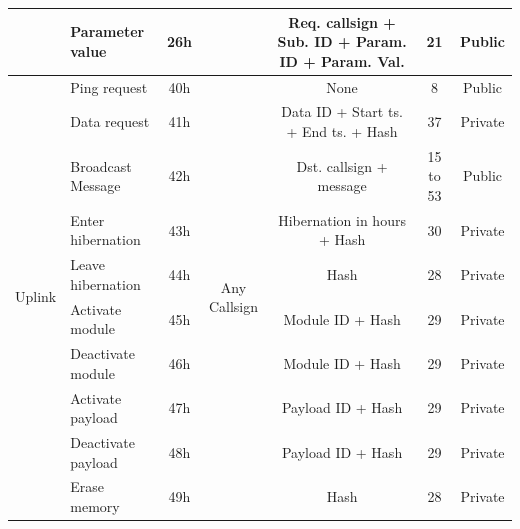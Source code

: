 \begin{landscape}
\begin{table}[!ht]
\begin{tabular}{llccccc}
                                      & Parameter value       & 26h &                                     & Req. callsign + Sub. \acs{ID} + Param. \acs{ID} + Param. Val. & 21                    & Public \\
            \midrule
            \multirow{14}{*}{Uplink}  & Ping request          & 40h & \multirow{14}{*}{Any Callsign}      & None                                           & 8                     & Public \\
                                      & Data request          & 41h &                                     & Data \acs{ID} + Start ts. + End ts. + Hash           & 37                    & Private \\
                                      & Broadcast Message     & 42h &                                     & Dst. callsign + message                        & 15 to 53              & Public \\
                                      & Enter hibernation     & 43h &                                     & Hibernation in hours + Hash                    & 30                    & Private \\
                                      & Leave hibernation     & 44h &                                     & Hash                                           & 28                    & Private \\
                                      & Activate module       & 45h &                                     & Module \acs{ID} + Hash                               & 29                    & Private \\
                                      & Deactivate module     & 46h &                                     & Module \acs{ID} + Hash                               & 29                    & Private \\
                                      & Activate payload      & 47h &                                     & Payload \acs{ID} + Hash                              & 29                    & Private \\
                                      & Deactivate payload    & 48h &                                     & Payload \acs{ID} + Hash                              & 29                    & Private \\
                                      & Erase memory          & 49h &                                     & Hash                                           & 28                    & Private \\

\end{tabular}
\end{table}
\end{landscape}

